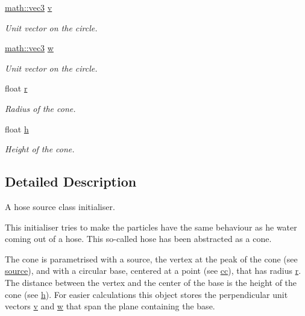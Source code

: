 \begin{DoxyCompactItemize}
\hyperlink{structphysim_1_1math_1_1vec3}{math\+::vec3} \hyperlink{classphysim_1_1init_1_1hose_a6ab9e1f0fe0f934bd2b8de922e26b294}{v}
\begin{DoxyCompactList}\small\item\em Unit vector on the circle. \end{DoxyCompactList}\item 
\hyperlink{structphysim_1_1math_1_1vec3}{math\+::vec3} \hyperlink{classphysim_1_1init_1_1hose_a0e97ba70e8d36a54fed03ce9472bf4cc}{w}
\begin{DoxyCompactList}\small\item\em Unit vector on the circle. \end{DoxyCompactList}\item 
\mbox{\label{classphysim_1_1init_1_1hose_a7dd44fc02769dcf88e7ce0fdca49676d}} 
float \hyperlink{classphysim_1_1init_1_1hose_a7dd44fc02769dcf88e7ce0fdca49676d}{r}
\begin{DoxyCompactList}\small\item\em Radius of the cone. \end{DoxyCompactList}\item 
\mbox{\label{classphysim_1_1init_1_1hose_a31d489427eb8f8db1b702cca637f8551}} 
float \hyperlink{classphysim_1_1init_1_1hose_a31d489427eb8f8db1b702cca637f8551}{h}
\begin{DoxyCompactList}\small\item\em Height of the cone. \end{DoxyCompactList}\end{DoxyCompactItemize}


\subsection{Detailed Description}
A hose source class initialiser. 

This initialiser tries to make the particles have the same behaviour as he water coming out of a hose. This so-\/called hose has been abstracted as a cone.

The cone is parametrised with a source, the vertex at the peak of the cone (see \hyperlink{classphysim_1_1init_1_1hose_ad0714340c9f5459645dfdc0f51fd0b46}{source}), and with a circular base, centered at a point (see \hyperlink{classphysim_1_1init_1_1hose_ade0e7778aea40fc3d7f471bc999ad541}{cc}), that has radius \hyperlink{classphysim_1_1init_1_1hose_a7dd44fc02769dcf88e7ce0fdca49676d}{r}. The distance between the vertex and the center of the base is the height of the cone (see \hyperlink{classphysim_1_1init_1_1hose_a31d489427eb8f8db1b702cca637f8551}{h}). For easier calculations this object stores the perpendicular unit vectors \hyperlink{classphysim_1_1init_1_1hose_a6ab9e1f0fe0f934bd2b8de922e26b294}{v} and \hyperlink{classphysim_1_1init_1_1hose_a0e97ba70e8d36a54fed03ce9472bf4cc}{w} that span the plane containing the base.

